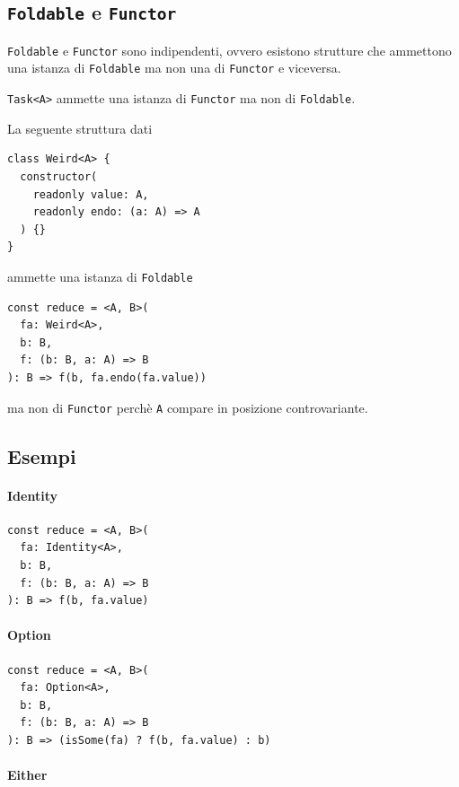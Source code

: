 \documentclass[12pt]{article}
\begin{document}
\subsection{\texttt{Foldable} e \texttt{Functor}}

\texttt{Foldable} e \texttt{Functor} sono indipendenti, ovvero esistono strutture che ammettono una istanza di \texttt{Foldable} ma non una di
\texttt{Functor} e viceversa.

\texttt{Task<A>} ammette una istanza di \texttt{Functor} ma non di \texttt{Foldable}.

La seguente struttura dati

\begin{verbatim}
class Weird<A> {
  constructor(
    readonly value: A,
    readonly endo: (a: A) => A
  ) {}
}
\end{verbatim}

ammette una istanza di \texttt{Foldable}

\begin{verbatim}
const reduce = <A, B>(
  fa: Weird<A>,
  b: B,
  f: (b: B, a: A) => B
): B => f(b, fa.endo(fa.value))
\end{verbatim}

ma non di \texttt{Functor} perchè \texttt{A} compare in posizione controvariante.

\subsection{Esempi}

\paragraph{Identity}

\begin{verbatim}
const reduce = <A, B>(
  fa: Identity<A>,
  b: B,
  f: (b: B, a: A) => B
): B => f(b, fa.value)
\end{verbatim}

\paragraph{Option}

\begin{verbatim}
const reduce = <A, B>(
  fa: Option<A>,
  b: B,
  f: (b: B, a: A) => B
): B => (isSome(fa) ? f(b, fa.value) : b)
\end{verbatim}

\paragraph{Either}
\end{document}

